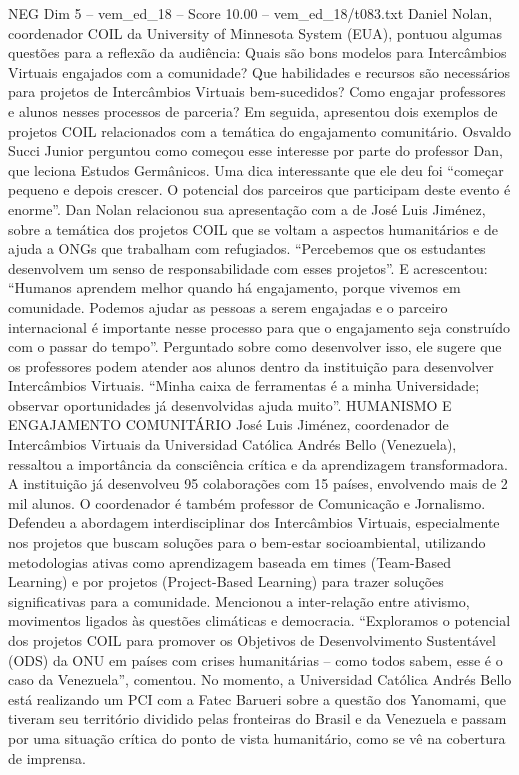 \begin{textsample}{NEG Dim 5 – vem\_ed\_18 – Score 10.00 – vem\_ed\_18/t083.txt}  \label{ex:f5_neg_133}
Daniel Nolan, coordenador COIL da University of Minnesota System (EUA), pontuou algumas questões para a reflexão da audiência: Quais são bons modelos para Intercâmbios Virtuais engajados com a comunidade?
Que habilidades e recursos são necessários para projetos de Intercâmbios Virtuais bem-sucedidos?
Como engajar professores e alunos nesses processos de parceria?
Em seguida, apresentou dois exemplos de projetos COIL relacionados com a temática do engajamento comunitário.
Osvaldo Succi Junior perguntou como começou esse interesse por parte do professor Dan, que leciona Estudos Germânicos.
Uma dica interessante que ele deu foi “começar pequeno e depois crescer.
O potencial dos parceiros que participam deste evento é enorme”.
Dan Nolan relacionou sua apresentação com a de José Luis Jiménez, sobre a temática dos projetos COIL que se voltam a aspectos humanitários e de ajuda a ONGs que trabalham com refugiados. “Percebemos que os estudantes desenvolvem um senso de responsabilidade com esses projetos”.
E acrescentou: “Humanos aprendem melhor quando há engajamento, porque vivemos em comunidade.
Podemos ajudar as pessoas a serem engajadas e o parceiro internacional é importante nesse processo para que o engajamento seja construído com o passar do tempo”.
Perguntado sobre como desenvolver isso, ele sugere que os professores podem atender aos alunos dentro da instituição para desenvolver Intercâmbios Virtuais. “Minha caixa de ferramentas é a minha Universidade; observar oportunidades já desenvolvidas ajuda muito”.
HUMANISMO E ENGAJAMENTO COMUNITÁRIO José Luis Jiménez, coordenador de Intercâmbios Virtuais da Universidad Católica Andrés Bello (Venezuela), ressaltou a importância da consciência crítica e da aprendizagem transformadora.
A instituição já desenvolveu 95 colaborações com 15 países, envolvendo mais de 2 mil alunos.
O coordenador é também professor de Comunicação e Jornalismo.
Defendeu a abordagem interdisciplinar dos Intercâmbios Virtuais, especialmente nos projetos que buscam soluções para o bem-estar socioambiental, utilizando metodologias ativas como aprendizagem baseada em times (Team-Based Learning) e por projetos (Project-Based Learning) para trazer soluções significativas para a comunidade.
Mencionou a inter-relação entre ativismo, movimentos ligados às questões climáticas e democracia. “Exploramos o potencial dos projetos COIL para promover os Objetivos de Desenvolvimento Sustentável (ODS) da ONU em países com crises humanitárias – como todos sabem, esse é o caso da Venezuela”, comentou.
No momento, a Universidad Católica Andrés Bello está realizando um PCI com a Fatec Barueri sobre a questão dos Yanomami, que tiveram seu território dividido pelas fronteiras do Brasil e da Venezuela e passam por uma situação crítica do ponto de vista humanitário, como se vê na cobertura de imprensa.

\end{textsample}
